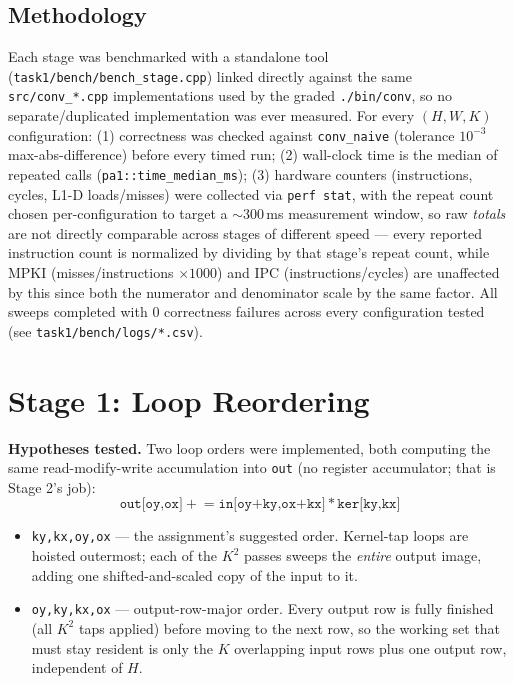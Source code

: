 \documentclass[11pt]{article}
\begin{document}
\subsection{Methodology}
Each stage was benchmarked with a standalone tool (\texttt{task1/bench/bench\_stage.cpp})
linked directly against the same \texttt{src/conv\_*.cpp} implementations used by the graded
\texttt{./bin/conv}, so no separate/duplicated implementation was ever measured. For every
$(H,W,K)$ configuration: (1) correctness was checked against \texttt{conv\_naive} (tolerance
$10^{-3}$ max-abs-difference) before every timed run; (2) wall-clock time is the median of
repeated calls (\texttt{pa1::time\_median\_ms}); (3) hardware counters (instructions, cycles,
L1-D loads/misses) were collected via \texttt{perf stat}, with the repeat count chosen
per-configuration to target a $\sim$300\,ms measurement window, so raw \emph{totals} are not
directly comparable across stages of different speed --- every reported instruction count is
normalized by dividing by that stage's repeat count, while MPKI (misses/instructions
$\times 1000$) and IPC (instructions/cycles) are unaffected by this since both the numerator
and denominator scale by the same factor. All sweeps completed with 0 correctness failures
across every configuration tested (see \texttt{task1/bench/logs/*.csv}).

\section{Stage 1: Loop Reordering}

\textbf{Hypotheses tested.} Two loop orders were implemented, both computing the same
read-modify-write accumulation into \texttt{out} (no register accumulator; that is Stage
2's job):
\[
\texttt{out[oy,ox]} \mathrel{+}= \texttt{in[oy+ky,ox+kx]} * \texttt{ker[ky,kx]}
\]
\begin{itemize}
  \item \texttt{ky,kx,oy,ox} --- the assignment's suggested order. Kernel-tap loops are
  hoisted outermost; each of the $K^2$ passes sweeps the \emph{entire} output image, adding
  one shifted-and-scaled copy of the input to it.
  \item \texttt{oy,ky,kx,ox} --- output-row-major order. Every output row is fully finished
  (all $K^2$ taps applied) before moving to the next row, so the working set that must stay
  resident is only the $K$ overlapping input rows plus one output row, independent of $H$.
\end{itemize}
\end{document}
